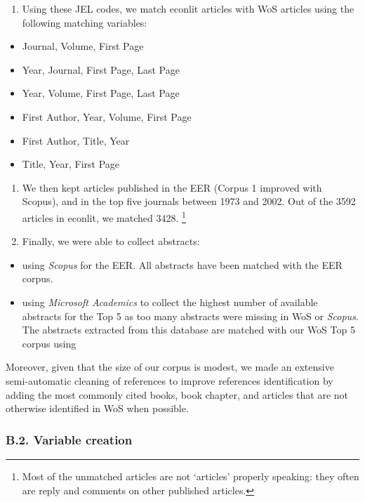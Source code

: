 \documentclass[
  12pt,
  onecolumn]{article}
\providecommand{\tightlist}{%
  \setlength{\itemsep}{0pt}\setlength{\parskip}{0pt}}
\begin{document}
\begin{enumerate}
\def\labelenumi{\arabic{enumi}.}
\setcounter{enumi}{1}
\tightlist
\item
  Using these JEL codes, we match econlit articles with WoS articles using the following matching variables:
\end{enumerate}

\begin{itemize}
\tightlist
\item
  Journal, Volume, First Page
\item
  Year, Journal, First Page, Last Page
\item
  Year, Volume, First Page, Last Page
\item
  First Author, Year, Volume, First Page
\item
  First Author, Title, Year
\item
  Title, Year, First Page
\end{itemize}

\begin{enumerate}
\def\labelenumi{\arabic{enumi}.}
\setcounter{enumi}{2}
\item
  We then kept articles published in the EER (Corpus 1 improved with Scopus), and in the top five journals between 1973 and 2002. Out of the 3592 articles in econlit, we matched 3428. \footnote{Most of the unmatched articles are not `articles' properly speaking: they often are reply and comments on other published articles.}
\item
  Finally, we were able to collect abstracts:
\end{enumerate}

\begin{itemize}
\tightlist
\item
  using \emph{Scopus} for the EER. All abstracts have been matched with the EER corpus.
\item
  using \emph{Microsoft Academics} to collect the highest number of available abstracts for the Top 5 as too many abstracts were missing in WoS or \emph{Scopus}. The abstracts extracted from this database are matched with our WoS Top 5 corpus using
\end{itemize}

Moreover, given that the size of our corpus is modest, we made an extensive semi-automatic cleaning of references to improve references identification by adding the most commonly cited books, book chapter, and articles that are not otherwise identified in WoS when possible.

\hypertarget{b.2.-variable-creation}{%
\subsubsection*{B.2. Variable creation}\label{b.2.-variable-creation}}
\end{document}
